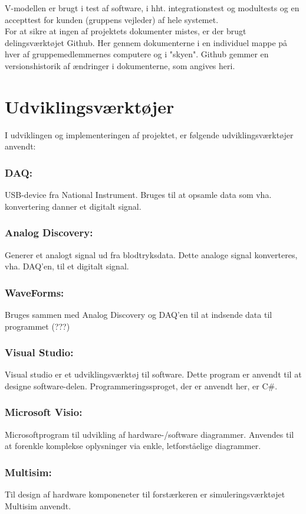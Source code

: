 V-modellen er brugt i test af software, i hht. integrationstest og modultests og en accepttest for kunden (gruppens vejleder) af hele systemet. \\
\newline
For at sikre at ingen af projektets dokumenter mistes, er der brugt delingsværktøjet Github. Her gennem dokumenterne i en individuel mappe på hver af gruppemedlemmernes computere og i "skyen". Github gemmer en versionshistorik af ændringer i dokumenterne, som angives heri.  

\section{Udviklingsværktøjer} %
I udviklingen og implementeringen af projektet, er følgende udviklingsværktøjer anvendt:
\subsubsection{DAQ:}
USB-device fra National Instrument. Bruges til at opsamle data som vha. konvertering danner et digitalt signal.
\subsubsection{Analog Discovery:}
Generer et analogt signal ud fra blodtryksdata. Dette analoge signal konverteres, vha. DAQ'en, til et digitalt signal.
\subsubsection{WaveForms:}
Bruges sammen med Analog Discovery og DAQ'en til at indsende data til programmet (???)
\subsubsection{Visual Studio:}
Visual studio er et udviklingsværktøj til software. Dette program er anvendt til at designe software-delen. Programmeringssproget, der er anvendt her, er C$\#$. 
\subsubsection{Microsoft Visio:}
Microsoftprogram til udvikling af hardware-/software diagrammer. Anvendes til at forenkle komplekse oplysninger via enkle, letforståelige diagrammer.
\subsubsection{Multisim:}
Til design af hardware komponeneter til forstærkeren er simuleringsværktøjet Multisim anvendt. 
